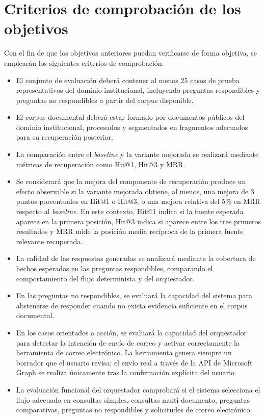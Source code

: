 \section{Criterios de comprobación de los objetivos}\label{sec:criterios}

Con el fin de que los objetivos anteriores puedan verificarse de forma objetiva, se emplearán los siguientes criterios de comprobación:

\begin{itemize}
    \item El conjunto de evaluación deberá contener al menos 25 casos de prueba representativos del dominio institucional, incluyendo preguntas respondibles y preguntas no respondibles a partir del corpus disponible.
    
    \item El corpus documental deberá estar formado por documentos públicos del dominio institucional, procesados y segmentados en fragmentos adecuados para su recuperación posterior.
    
    \item La comparación entre el \textit{baseline} y la variante mejorada se realizará mediante métricas de recuperación como Hit@1, Hit@3 y MRR.
    
    \item Se considerará que la mejora del componente de recuperación produce un efecto observable si la variante mejorada obtiene, al menos, una mejora de 3 puntos porcentuales en Hit@1 o Hit@3, o una mejora relativa del 5\% en MRR respecto al \textit{baseline}. 
    En este contexto, Hit@1 indica si la fuente esperada aparece en la primera posición, Hit@3 indica si aparece entre los tres primeros resultados y MRR mide la posición media recíproca de la primera fuente relevante recuperada.
    
    \item La calidad de las respuestas generadas se analizará mediante la cobertura de hechos esperados en las preguntas respondibles, comparando el comportamiento del flujo determinista y del orquestador.
    
    \item En las preguntas no respondibles, se evaluará la capacidad del sistema para abstenerse de responder cuando no exista evidencia suficiente en el corpus documental.
    
    \item En los casos orientados a acción, se evaluará la capacidad del orquestador para detectar la intención de envío de correo y activar correctamente la herramienta de correo electrónico. La herramienta genera siempre un borrador que el usuario revisa; el envío real a través de la API de Microsoft Graph se realiza únicamente tras la confirmación explícita del usuario.
    
    \item La evaluación funcional del orquestador comprobará si el sistema selecciona el flujo adecuado en consultas simples, consultas multi-documento, preguntas comparativas, preguntas no respondibles y solicitudes de correo electrónico.
\end{itemize}

